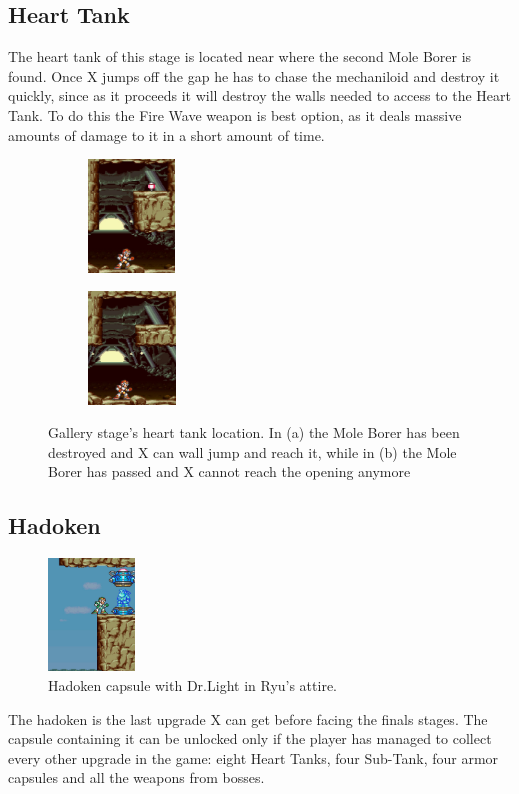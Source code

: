\subsection{Heart Tank}
The heart tank of this stage is located near where the second Mole Borer is found. Once  X jumps off the gap he has to chase the mechaniloid and destroy it quickly, since as it proceeds it will destroy the walls needed to access to the Heart Tank. To do this the Fire Wave weapon is best option, as it deals massive amounts of damage to it in a short amount of time. 
\begin{figure}[htp]
	\centering
	\begin{subfigure}{0.2\linewidth}
		\centering
		\includegraphics[height=3cm]{figures/X1/Armored_armadillo/Armadillo_heart.jpg}
		\caption{}
	\end{subfigure}
	\begin{subfigure}{0.2\textwidth}
		\centering
		\includegraphics[height=3cm]{figures/X1/Armored_armadillo/Armadillo_heart_2.jpg}
		\caption{}
	\end{subfigure}
	\caption{Gallery stage's heart tank location. In (a) the Mole Borer has been destroyed and X can wall jump and reach it, while in (b) the Mole Borer has passed and X cannot reach the opening anymore}
\end{figure}

\subsection{Hadoken}\label{hadoken}
\begin{figure}[htp]
	\centering
	\includegraphics[height=3cm]{figures/X1/Armored_armadillo/Armadillo_hadoken.jpg}
	\caption{Hadoken capsule with Dr.Light in Ryu's attire.}
\end{figure}
The hadoken is the last upgrade X can get before facing the finals stages. The capsule containing it can be unlocked only if the player has managed to collect every other upgrade in the game: eight Heart Tanks, four Sub-Tank, four armor capsules and all the weapons from bosses. 

